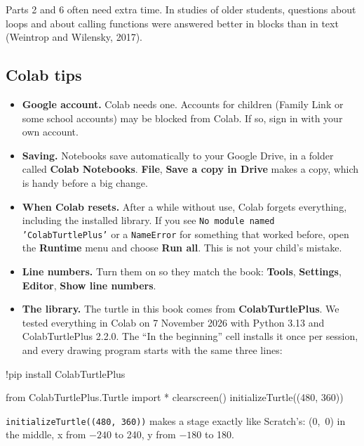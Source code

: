 Parts 2 and 6 often need extra time. In studies of older students, questions about loops and about calling functions were answered better in blocks than in text (Weintrop and Wilensky, 2017).

\subsection*{Colab tips}

\begin{itemize}
  \item \textbf{Google account.} Colab needs one. Accounts for children (Family Link or some school accounts) may be blocked from Colab. If so, sign in with your own account.
  \item \textbf{Saving.} Notebooks save automatically to your Google Drive, in a folder called \textbf{Colab Notebooks}. \textbf{File}, \textbf{Save a copy in Drive} makes a copy, which is handy before a big change.
  \item \textbf{When Colab resets.} After a while without use, Colab forgets everything, including the installed library. If you see \texttt{No module named 'ColabTurtlePlus'} or a \texttt{NameError} for something that worked before, open the \textbf{Runtime} menu and choose \textbf{Run all}. This is not your child's mistake.
  \item \textbf{Line numbers.} Turn them on so they match the book: \textbf{Tools}, \textbf{Settings}, \textbf{Editor}, \textbf{Show line numbers}.
  \item \textbf{The library.} The turtle in this book comes from \textbf{ColabTurtlePlus}. We tested everything in Colab on 7 November 2026 with Python 3.13 and ColabTurtlePlus 2.2.0. The ``In the beginning'' cell installs it once per session, and every drawing program starts with the same three lines:
\end{itemize}

\begin{code}
!pip install ColabTurtlePlus
\end{code}
\begin{code}
from ColabTurtlePlus.Turtle import *
clearscreen()
initializeTurtle((480, 360))
\end{code}

\texttt{initializeTurtle((480, 360))} makes a stage exactly like Scratch's: (0,~0) in the middle, x from $-240$ to 240, y from $-180$ to 180.

